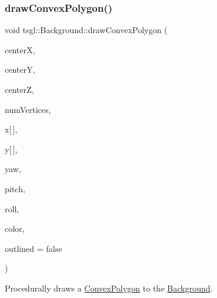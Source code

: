 \subsubsection{\texorpdfstring{draw\+Convex\+Polygon()}{drawConvexPolygon()}\hspace{0.1cm}{\footnotesize\ttfamily [1/2]}}
{\footnotesize\ttfamily void tsgl\+::\+Background\+::draw\+Convex\+Polygon (\begin{DoxyParamCaption}\item[{float}]{centerX,  }\item[{float}]{centerY,  }\item[{float}]{centerZ,  }\item[{int}]{num\+Vertices,  }\item[{float}]{x\mbox{[}$\,$\mbox{]},  }\item[{float}]{y\mbox{[}$\,$\mbox{]},  }\item[{float}]{yaw,  }\item[{float}]{pitch,  }\item[{float}]{roll,  }\item[{\hyperlink{structtsgl_1_1_color_float}{Color\+Float}}]{color,  }\item[{bool}]{outlined = {\ttfamily false} }\end{DoxyParamCaption})\hspace{0.3cm}{\ttfamily [virtual]}}



Procedurally draws a \hyperlink{classtsgl_1_1_convex_polygon}{Convex\+Polygon} to the \hyperlink{classtsgl_1_1_background}{Background}. 


